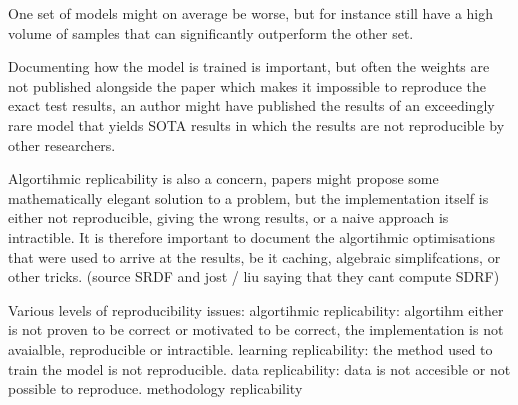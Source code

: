\documentclass[a4paper,12pt]{article}
\begin{document}
One set of models might on average be worse, but for instance still have
a high volume of samples that can significantly outperform the other set.

Documenting how the model is trained is important, but often the weights are not
published alongside the paper which makes it impossible to reproduce the exact 
test results, an author might have published the results of an exceedingly
rare model that yields SOTA results in which the results are not reproducible by
other researchers.

Algortihmic replicability is also a concern, papers might propose some mathematically
elegant solution to a problem, but the implementation itself is either not 
reproducible, giving the wrong results, or a naive approach is intractible.
It is therefore important to document the algortihmic optimisations that were
used to arrive at the results, be it caching, algebraic simplifcations, or
other tricks. (source SRDF and jost / liu saying that they cant compute SDRF)

Various levels of reproducibility issues:
algortihmic replicability: algortihm either is not proven to be
correct or motivated to be correct, the implementation is not
avaialble, reproducible or intractible.
learning replicability: the method used to train the model is not reproducible.
data replicability: data is not accesible or not possible to reproduce.
methodology replicability



\printbibliography
\end{document}
